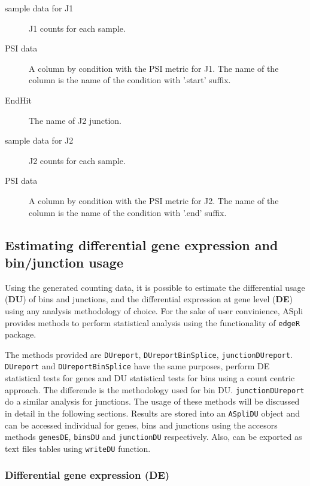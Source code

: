 \documentclass{article}
\begin{document}
\begin{itemize}
\begin{description}
      \item[sample data for J1] J1 counts for each sample.
      \item[PSI data] A column by condition with the PSI metric for J1. The name
      of the column is the name of the condition with '.start' suffix.
      \item[EndHit] The name of J2 junction.
      \item[sample data for J2] J2 counts for each sample.
      \item[PSI data] A column by condition with the PSI metric for J2. The name
      of the column is the name of the condition with '.end' suffix.
      \\
    \end{description}  

\end{itemize}

\subsection{ Estimating differential gene expression and bin/junction usage}

Using the generated counting data, it is possible to estimate the differential
usage (\textbf{DU}) of bins and junctions, and the differential expression at
gene level (\textbf{DE}) using any analysis methodology of choice. For the sake
of user convinience, ASpli provides methods to perform statistical analysis 
using the functionality of \texttt{edgeR} package.

The methods provided are \texttt{DUreport}, \texttt{DUreportBinSplice},
\texttt{junctionDUreport}. \texttt{DUreport} and \texttt{DUreportBinSplice}
have the same purposes, perform DE statistical tests for genes and DU
statistical tests for bins using a count centric approach.
The differende is the methodology used for bin DU. \texttt{junctionDUreport} do
a similar analysis for junctions. The usage of these methods will be discussed in detail
in the following sections. Results are stored into an \texttt{ASpliDU} object
and can be accessed individual for genes, bins and junctions using the accesors
methods \texttt{genesDE}, \texttt{binsDU} and \texttt{junctionDU}
respectively. Also, can be exported as text files tables using \texttt{writeDU}
function.


\subsubsection{Differential gene expression (DE)}
\end{document}
